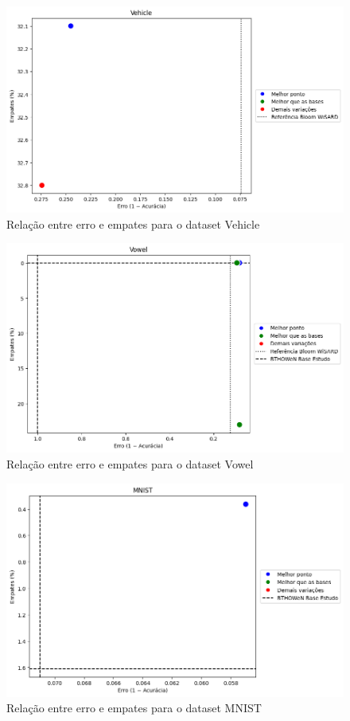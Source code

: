 \documentclass{article}
\begin{document}
\begin{figure}[H]
\centering
\includegraphics[width=1.1\textwidth]{figures/image7.png}
\caption{Relação entre erro e empates para o dataset Vehicle}
\label{fig:vehicle}
\end{figure}

\begin{figure}[H]
\centering
\includegraphics[width=1.1\textwidth]{figures/image8.png}
\caption{Relação entre erro e empates para o dataset Vowel}
\label{fig:vowel}
\end{figure}

\begin{figure}[H]
\centering
\includegraphics[width=1.1\textwidth]{figures/image11.png}
\caption{Relação entre erro e empates para o dataset MNIST}
\label{fig:mnist}
\end{figure}
\end{document}
